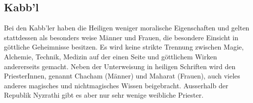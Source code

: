 \documentclass[12pt,twoside,twocolumn,openany]{book}
\begin{document}
%	
%	
%	


\subsection{Kabb'l}

Bei den Kabb'ler haben die Heiligen weniger moralische Eigenschaften und gelten stattdessen als besonders weise Männer und Frauen, die besondere Einsicht in göttliche Geheimnisse besitzen. Es wird keine strikte Trennung zwischen Magie, Alchemie, Technik, Medizin auf der einen Seite und göttlichem Wirken andererseits gemacht. Neben der Unterweisung in heiligen Schriften wird den PriesterInnen, genannt Chacham (Männer) und Maharat (Frauen), auch vieles anderes magisches und nichtmagisches Wissen beigebracht. Ausserhalb der Republik Nyzrathi gibt es aber nur sehr wenige weibliche Priester.
\end{document}
